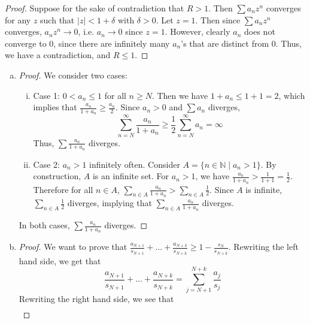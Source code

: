 \documentclass[11pt]{article}
\begin{document}
\begin{exercise}{10}
    \begin{proof}
        Suppose for the sake of contradiction that $R > 1$. Then $\sum a_nz^n$ converges for any $z$ such that $|z| < 1 + \delta$ with $\delta > 0$. Let $z = 1$. Then since $\sum a_nz^n$ converges, $a_nz^n \to 0$, i.e. $a_n \to 0$ since $z = 1$. However, clearly $a_n$ does not converge to 0, since there are infinitely many $a_n$'s that are distinct from 0. Thus, we have a contradiction, and $R \le 1$. 
    \end{proof}
\end{exercise}

\begin{exercise}{11}
    \begin{enumerate} [(a)]
        \item \begin{proof}
            We consider two cases: 
        \begin{enumerate} [(i)]
            \item Case 1: $0 < a_n \le 1$ for all $n \ge N$. Then we have $1 + a_n \le 1 + 1 = 2$, which implies that $\frac{a_n}{1 + a_n} \ge \frac{a_n}{2}$. Since $a_n > 0$ and $\sum a_n$ diverges, $$\sum_{n = N}^\infty \frac{a_n}{1 + a_n} \ge \frac{1}{2} \sum_{n = N}^\infty a_n = \infty$$ Thus, $\sum \frac{a_n}{1 + a_n}$ diverges.
            \item Case 2: $a_n > 1$ infinitely often. Consider $A = \{ n \in \mathbb{N} \mid a_n > 1 \}$. By construction, $A$ is an infinite set. For $a_n > 1$, we have $\frac{a_n}{1 + a_n} > \frac{1}{1+1} = \frac{1}{2}$. Therefore for all $n \in A$, $\sum_{n \in A} \frac{a_n}{1 + a_n} > \sum_{n \in A} \frac{1}{2}$. Since $A$ is infinite, $\sum_{n \in A} \frac{1}{2}$ diverges, implying that $\sum_{n \in A} \frac{a_n}{1 + a_n}$ diverges. 
        \end{enumerate}
        In both cases, $\sum \frac{a_n}{1 + a_n}$ diverges. 
        \end{proof}
        \item \begin{proof}
            We want to prove that $\frac{a_{N+1}}{s_{N+1}} + \dots + \frac{a_{N + k}}{s_{N + k}} \ge 1 - \frac{s_N}{s_{N+k}}$. Rewriting the left hand side, we get that $$\frac{a_{N+1}}{s_{N+1}} + \dots + \frac{a_{N + k}}{s_{N + k}} = \sum_{j = N + 1}^{N + k} \frac{a_j}{s_j}$$ Rewriting the right hand side, we see that
            \begin{equation*}
                \begin{split}

\end{split}
\end{equation*}
\end{proof}
\end{enumerate}
\end{exercise}
\end{document}
